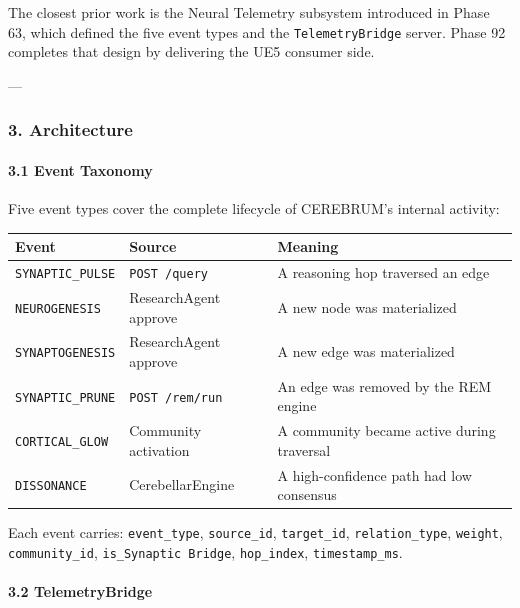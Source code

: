 The closest prior work is the Neural Telemetry subsystem introduced in Phase 63, which defined the five event types and the \texttt{TelemetryBridge} server. Phase 92 completes that design by delivering the UE5 consumer side.

---

\subsubsection{3. Archit\-ecture}

\paragraph{3.1 Event Taxonomy}

Five event types cover the complete lifecycle of CEREBRUM's internal activity:

\begin{center}
{\footnotesize
\begin{tabularx}{\columnwidth}{|>{\raggedright\arraybackslash}X|>{\raggedright\arraybackslash}X|>{\raggedright\arraybackslash}X|}
\hline
Event & Source & Meaning \\ \hline
\texttt{SYNAPTIC\_PULSE} & \texttt{POST /query} & A reasoning hop traversed an edge \\ \hline
\texttt{NEUROGENESIS} & ResearchAgent approve & A new node was mater\-ialized \\ \hline
\texttt{SYNAPTOGENESIS} & ResearchAgent approve & A new edge was mater\-ialized \\ \hline
\texttt{SYNAPTIC\_PRUNE} & \texttt{POST /rem/run} & An edge was removed by the REM engine \\ \hline
\texttt{CORTICAL\_GLOW} & Community activation & A community became active during traversal \\ \hline
\texttt{DISSONANCE} & CerebellarEngine & A high-confidence path had low consensus \\ \hline
\end{tabularx}
}
\end{center}

Each event carries: \texttt{event\_type}, \texttt{source\_id}, \texttt{target\_id}, \texttt{relation\_type}, \texttt{weight}, \texttt{community\_id}, \texttt{is\_Synaptic Bridge}, \texttt{hop\_index}, \texttt{timestamp\_ms}.

\paragraph{3.2 TelemetryBridge}

